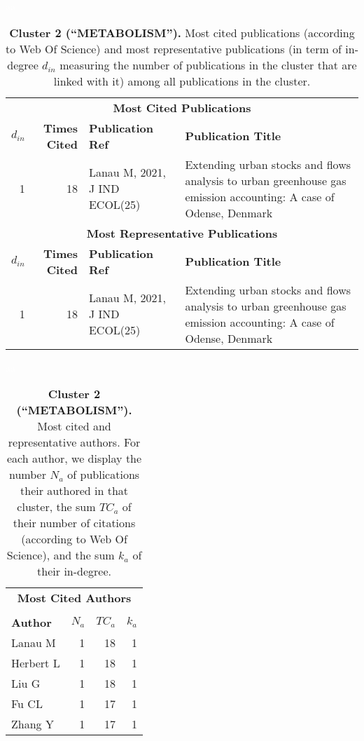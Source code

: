 \documentclass[a4paper,11pt]{report}
\begin{document}
\begin{landscape}
\begin{table}[!ht]
\caption*{{\bf Cluster 2 (``METABOLISM'').} Most cited publications (according to Web Of Science) and most representative publications (in term of in-degree $d_{in}$ measuring the number of publications in the cluster that are linked with it) among all publications in the cluster.}
\textcolor{white}{aa}\\
{\scriptsize\begin{tabular}{|r r p{7cm} p{17cm}|}
\hline
\multicolumn{4}{|c|}{{\bf Most Cited Publications}}\\
{\bf $d_{in}$} & {\bf Times Cited} & {\bf Publication Ref} & {\bf Publication Title} \\
1 & 18 & Lanau M, 2021, J IND ECOL(25) & Extending urban stocks and flows analysis to urban greenhouse gas emission accounting: A case of Odense, Denmark\\
\hline
\hline
\multicolumn{4}{|c|}{{\bf Most Representative Publications}}\\
{\bf $d_{in}$} & {\bf Times Cited} & {\bf Publication Ref} & {\bf Publication Title} \\
1 & 18 & Lanau M, 2021, J IND ECOL(25) & Extending urban stocks and flows analysis to urban greenhouse gas emission accounting: A case of Odense, Denmark\\
\hline
\end{tabular}
}
\end{table}

\clearpage

\begin{table}[!ht]
\caption*{{\bf Cluster 2 (``METABOLISM'').} Most cited and representative authors. For each author, we display the number $N_a$ of publications their authored in that cluster, the sum $TC_a$ of their number of citations (according to Web Of Science), and the sum $k_a$ of their in-degree. }
\textcolor{white}{aa}\\
{\scriptsize\begin{tabular}{|l r r r|}
\hline
\multicolumn{4}{|c|}{{\bf Most Cited Authors}}\\
&&&\\
{\bf Author} & {\bf $N_a$} & {\bf $TC_a$} & {\bf $k_a$}\\
Lanau M & 1 & 18 & 1 \\
Herbert L & 1 & 18 & 1 \\
Liu G & 1 & 18 & 1 \\
Fu CL & 1 & 17 & 1 \\
Zhang Y & 1 & 17 & 1 \\
\hline


\end{tabular}}
\end{table}
\end{landscape}
\end{document}
